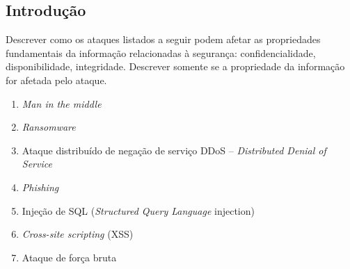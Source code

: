 \subsection*{Introdução}

\exercise Descrever como os ataques listados a seguir podem 
afetar as propriedades fundamentais da informação relacionadas
à segurança: confidencialidade, disponibilidade, integridade. 
Descrever somente se a propriedade da informação for afetada 
pelo ataque.

\begin{enumerate}[a]
\item {\it Man in the middle\/}
\item {\it Ransomware\/}
\item Ataque distribuído de negação de serviço {DDoS -- {\it Distributed Denial of Service\/}}
\item {\it Phishing\/}
\item Injeção de SQL ({\it Structured Query Language\/} injection)
\item {\it Cross-site scripting\/} (XSS)
\item Ataque de força bruta
\end{enumerate}
